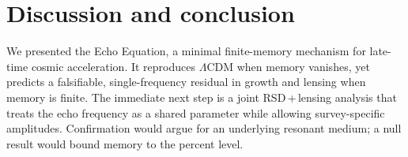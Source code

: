 \section{Discussion and conclusion}
\label{sec:conclusion}

We presented the Echo Equation, a minimal finite-memory mechanism for late-time cosmic acceleration. It reproduces $\Lambda$CDM when memory vanishes, yet predicts a falsifiable, single-frequency residual in growth and lensing when memory is finite. The immediate next step is a joint RSD\,+\,lensing analysis that treats the echo frequency as a shared parameter while allowing survey-specific amplitudes. Confirmation would argue for an underlying resonant medium; a null result would bound memory to the percent level.
